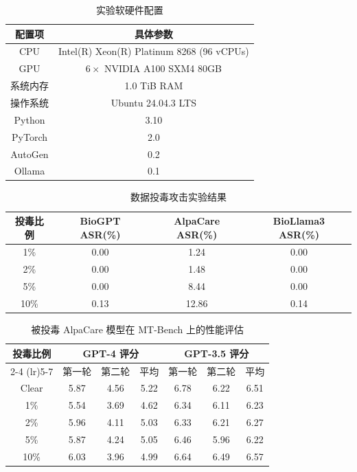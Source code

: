 \begin{table}[htbp]
\centering
\caption{实验软硬件配置}
\label{tab:exp_env}
\begin{tabular}{cc}
\toprule
配置项 & 具体参数 \\
\midrule
CPU & Intel(R) Xeon(R) Platinum 8268 (96 vCPUs) \\
GPU & $6 \times$ NVIDIA A100 SXM4 80GB \\
系统内存 & 1.0 TiB RAM \\
操作系统 & Ubuntu 24.04.3 LTS \\
Python & 3.10 \\
PyTorch & 2.0 \\
AutoGen & 0.2 \\
Ollama & 0.1 \\
\bottomrule
\end{tabular}
\end{table}

\begin{table}[htbp]
\centering
\caption{数据投毒攻击实验结果}
\label{tab:poison_results}
\begin{tabular}{cccc}
\toprule
投毒比例 & BioGPT ASR(\%) & AlpaCare ASR(\%) & BioLlama3 ASR(\%) \\
\midrule
1\% & 0.00 & 1.24 & 0.00 \\
2\% & 0.00 & 1.48 & 0.00 \\
5\% & 0.00 & 8.44 & 0.00 \\
10\% & 0.13 & 12.86 & 0.14 \\
\bottomrule
\end{tabular}
\end{table}

\begin{table}[htbp]
\centering
\caption{被投毒 AlpaCare 模型在 MT-Bench 上的性能评估}
\label{tab:poison_mt_bench}
\begin{tabular}{ccccccc}
\toprule
\multirow{2}{*}{投毒比例} & \multicolumn{3}{c}{GPT-4 评分} & \multicolumn{3}{c}{GPT-3.5 评分} \\
\cmidrule(lr){2-4} \cmidrule(lr){5-7}
 & 第一轮 & 第二轮 & 平均 & 第一轮 & 第二轮 & 平均 \\
\midrule
Clear & 5.87 & 4.56 & 5.22 & 6.78 & 6.22 & 6.51 \\
1\% & 5.54 & 3.69 & 4.62 & 6.34 & 6.11 & 6.23 \\
2\% & 5.96 & 4.11 & 5.03 & 6.33 & 6.21 & 6.27 \\
5\% & 5.87 & 4.24 & 5.05 & 6.46 & 5.96 & 6.22 \\
10\% & 6.03 & 3.96 & 4.99 & 6.64 & 6.49 & 6.57 \\
\bottomrule
\end{tabular}
\end{table}

